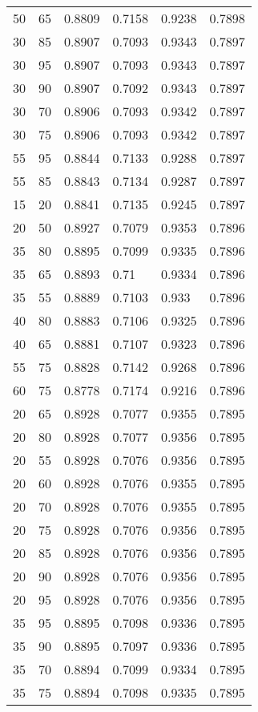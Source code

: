 \begin{center}
\begin{longtable}{|l|l|l|l|l|l|}
50 & 65 & 0.8809 & 0.7158 & 0.9238 & 0.7898 \\
30 & 85 & 0.8907 & 0.7093 & 0.9343 & 0.7897 \\
30 & 95 & 0.8907 & 0.7093 & 0.9343 & 0.7897 \\
30 & 90 & 0.8907 & 0.7092 & 0.9343 & 0.7897 \\
30 & 70 & 0.8906 & 0.7093 & 0.9342 & 0.7897 \\
30 & 75 & 0.8906 & 0.7093 & 0.9342 & 0.7897 \\
55 & 95 & 0.8844 & 0.7133 & 0.9288 & 0.7897 \\
55 & 85 & 0.8843 & 0.7134 & 0.9287 & 0.7897 \\
15 & 20 & 0.8841 & 0.7135 & 0.9245 & 0.7897 \\
20 & 50 & 0.8927 & 0.7079 & 0.9353 & 0.7896 \\
35 & 80 & 0.8895 & 0.7099 & 0.9335 & 0.7896 \\
35 & 65 & 0.8893 & 0.71   & 0.9334 & 0.7896 \\
35 & 55 & 0.8889 & 0.7103 & 0.933  & 0.7896 \\
40 & 80 & 0.8883 & 0.7106 & 0.9325 & 0.7896 \\
40 & 65 & 0.8881 & 0.7107 & 0.9323 & 0.7896 \\
55 & 75 & 0.8828 & 0.7142 & 0.9268 & 0.7896 \\
60 & 75 & 0.8778 & 0.7174 & 0.9216 & 0.7896 \\
20 & 65 & 0.8928 & 0.7077 & 0.9355 & 0.7895 \\
20 & 80 & 0.8928 & 0.7077 & 0.9356 & 0.7895 \\
20 & 55 & 0.8928 & 0.7076 & 0.9356 & 0.7895 \\
20 & 60 & 0.8928 & 0.7076 & 0.9355 & 0.7895 \\
20 & 70 & 0.8928 & 0.7076 & 0.9355 & 0.7895 \\
20 & 75 & 0.8928 & 0.7076 & 0.9356 & 0.7895 \\
20 & 85 & 0.8928 & 0.7076 & 0.9356 & 0.7895 \\
20 & 90 & 0.8928 & 0.7076 & 0.9356 & 0.7895 \\
20 & 95 & 0.8928 & 0.7076 & 0.9356 & 0.7895 \\
35 & 95 & 0.8895 & 0.7098 & 0.9336 & 0.7895 \\
35 & 90 & 0.8895 & 0.7097 & 0.9336 & 0.7895 \\
35 & 70 & 0.8894 & 0.7099 & 0.9334 & 0.7895 \\
35 & 75 & 0.8894 & 0.7098 & 0.9335 & 0.7895 \\

\end{longtable}
\end{center}

